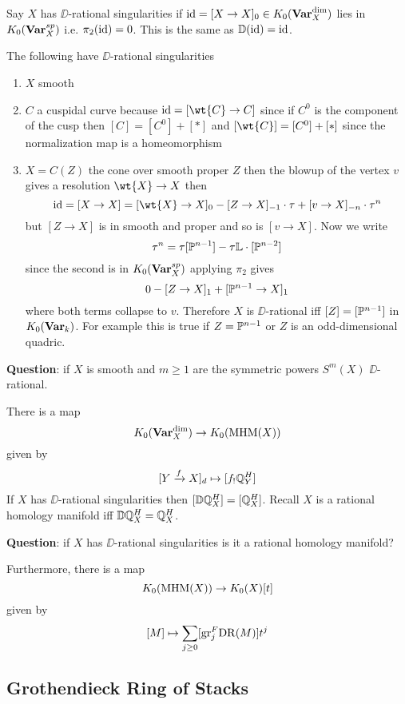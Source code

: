 \documentclass[12pt]{article}
\newcommand{\LL}{\mathbb{L}}
\begin{document}
\begin{defn}
Say $X$ has $\DD$-rational singularities if $\id = [X \to X]_0 \in K_0(\Var_X^{\dim})$ lies in $K_0(\Var_X^{sp})$ i.e. $\pi_2(\id) = 0$. This is the same as $\DD(\id) = \id$.
\end{defn}

\begin{example}
The following have $\DD$-rational singularities
\begin{enumerate}
\item $X$ smooth
\item $C$ a cuspidal curve because $\id = [\wt{C} \to C]$ since if $C^0$ is the component of the cusp then $[C] = [C^0] + [*]$ and $[\wt{C}] = [C^0] + [*]$ since the normalization map is a homeomorphism
\item $X = C(Z)$ the cone over smooth proper $Z$ then the blowup of the vertex $v$ gives a resolution $\wt{X} \to X$ then
\[ \id = [X \to X] = [\wt{X} \to X]_0 - [Z \to X]_{-1} \cdot \tau + [v \to X]_{-n} \cdot \tau^n \] 
but $[Z \to X]$ is in smooth and proper and so is $[v \to X]$. Now we write
\[ \tau^n = \tau [\PP^{n-1}] - \tau \LL \cdot [\PP^{n-2}] \]
since the second is in $K_0(\Var_X^{sp})$ applying $\pi_2$ gives
\[ 0 - [Z \to X]_1 + [\PP^{n-1} \to X]_1 \]
where both terms collapse to $v$. Therefore $X$ is $\DD$-rational iff $[Z] = [\PP^{n-1}]$ in $K_0(\Var_k)$. For example this is true if $Z = \P^{n-1}$ or $Z$ is an odd-dimensional quadric. 
\end{enumerate}
\end{example}

\textbf{Question}: if $X$ is smooth and $m \ge 1$ are the symmetric powers $S^m(X)$ $\DD$-rational. 


There is a map
\[ K_0(\Var_X^{\dim}) \to K_0(\MHM(X)) \]
given by
\[ [Y \xrightarrow{f} X]_d \mapsto [f_! \Q_Y^H] \]
If $X$ has $\DD$-rational singularities then $[\DD \Q_X^H] = [\Q_X^H]$. Recall $X$ is a rational homology manifold iff $\DD \Q_X^H = \Q_X^H$.

\textbf{Question}: if $X$ has $\DD$-rational singularities is it a rational homology manifold?

\newcommand{\St}{\mathbf{St}}

Furthermore, there is a map
\[ K_0(\MHM(X)) \to K_0(X)[t] \]
given by
\[ [M] \mapsto \sum_{j \ge 0} [\mathrm{gr}^F_j \DR(M)] t^j \]

\subsection{Grothendieck Ring of Stacks}
\end{document}
